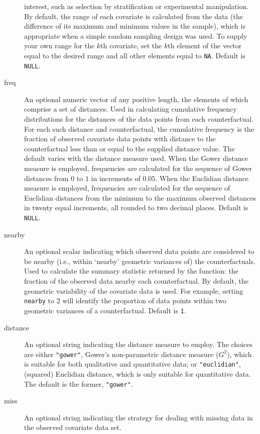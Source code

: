 \documentclass[oneside,letterpaper,titlepage]{article}
\begin{document}
\begin{description}
  interest, such as selection by stratification or experimental
  manipulation.  By default, the range of each covariate is calculated
  from the data (the difference of its maximum and minimum values in
  the sample), which is appropriate when a simple random sampling
  design was used.  To supply your own range for the $k$th covariate,
  set the $k$th element of the vector equal to the desired range and
  all other elements equal to \texttt{NA}.  Default is \texttt{NULL}.
\item[freq] An optional numeric vector of any positive length, the
  elements of which comprise a set of distances.  Used in calculating
  cumulative frequency distributions for the distances of the data
  points from each counterfactual.  For each such distance and
  counterfactual, the cumulative frequency is the fraction of observed
  covariate data points with distance to the counterfactual less than
  or equal to the supplied distance value.  The default varies with
  the distance measure used.  When the Gower distance measure is
  employed, frequencies are calculated for the sequence of Gower
  distances from $0$ to $1$ in increments of $0.05$.  When the Euclidian
  distance measure is employed, frequencies are calculated for the
  sequence of Euclidian distances from the minimum to the maximum
  observed distances in twenty equal increments, all rounded to two
  decimal places. Default is \texttt{NULL}.
\item[nearby] An optional scalar indicating which observed data
  points are considered to be nearby (i.e., within `nearby' geometric
  variances of) the counterfactuals.  Used to calculate the summary
  statistic returned by the function: the fraction of the observed
  data nearby each counterfactual.  By default, the geometric
  variability of the covariate data is used.  For example, setting
  \texttt{nearby} to $2$ will identify the proportion of data points
  within two geometric variances of a counterfactual.  Default is \texttt{1}.
\item[distance] An optional string indicating the distance measure to
  employ.  The choices are either \texttt{"gower"}, Gower's
  non-parametric distance measure ($G^{2}$), which is suitable for
  both qualitative and quantitative data; or \texttt{"euclidian"},
  (squared) Euclidian distance, which is only suitable for quantitative
  data.  The default is the former, \texttt{"gower"}.
\item[miss] An optional string indicating the strategy for dealing
  with missing data in the observed covariate data set.

\end{description}
\end{document}
